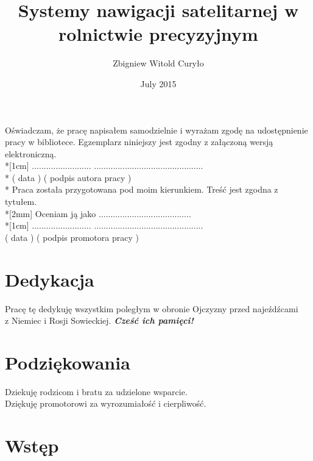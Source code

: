 \documentclass[12pt,twoside]{report} %
\title{Systemy nawigacji satelitarnej w rolnictwie precyzyjnym}
\author{Zbigniew Witold Curyło}
\date{July 2015}
\begin{document}
 \sloppy



\chapter*{}
		Oświadczam, że pracę napisałem samodzielnie i wyrażam zgodę na udostępnienie pracy w bibliotece.
		Egzemplarz niniejszy jest zgodny z załączoną wersją elektroniczną.\\*[1cm]
		......................... \hfill ..............................................\\*
		\hspace*{0.5cm} ( data ) \hfill ( podpis autora pracy ) \hspace*{0.5cm}\\* 
		\vfill
		\noindent Praca została przygotowana pod moim kierunkiem. Treść jest zgodna z tytułem.\\*[2mm]
		Oceniam ją jako .......................................\\*[1cm]
		......................... \hfill ..............................................\\
		\hspace*{0.5cm} ( data ) \hfill ( podpis promotora pracy ) \hspace*{2mm}\\			
 		\vfill
\chapter*{Dedykacja}
\justify
Pracę tę dedykuję wszystkim poległym w obronie Ojczyzny przed najeźdźcami\\ z Niemiec i Rosji Sowieckiej.
\textbf{\textit{Cześć ich pamięci!}}
\chapter*{Podziękowania}
Dziekuję rodzicom i bratu za udzielone wsparcie.\\Dziękuję promotorowi za wyrozumiałość i cierpliwość.

\tableofcontents
\newpage
{}

\chapter{Wstęp}

\end{document}
